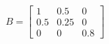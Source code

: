 \documentclass[preview]{standalone}
\begin{document}
\begin{align*}
B = \begin{bmatrix} 1 & 0.5 & 0 \\ 0.5 & 0.25 & 0 \\ 0 & 0 & 0.8 \end{bmatrix}
\end{align*}
\end{document}
